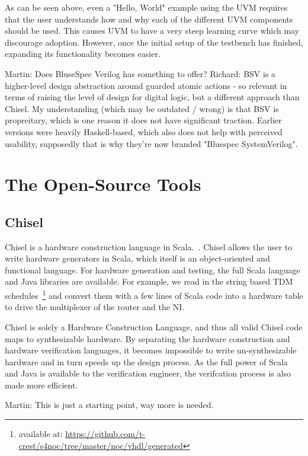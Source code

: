 \documentclass[a4paper, conference]{IEEEtran}
\newcommand{\martin}[1]{{\color{blue} Martin: #1}}
\newcommand{\ducky}[1]{{\color{orange} Richard: #1}}
\begin{document}
As can be seen above, even a "Hello, World" example using the UVM requires that the user understands how and why each of the different UVM components should be used. This causes UVM to have a very steep learning curve which may discourage adoption. However, once the initial setup of the testbench has finished, expanding its functionality becomes easier.


\martin{Does BluseSpec Verilog has something to offer?}
\ducky{BSV is a higher-level design abstraction around guarded atomic actions - so relevant in terms of raising the level of design for digital logic, but a different approach than Chisel. My understanding (which may be outdated / wrong) is that BSV is propreitary, which is one reason it does not have significant traction. Earlier versions were heavily Haskell-based, which also does not help with perceived usability, supposedly that is why they're now branded "Bluespec SystemVerilog".}

\section{The Open-Source Tools}

\subsection{Chisel}

Chisel is a hardware construction language in Scala.~\cite{chisel:dac2012}.
Chisel allows the user to write hardware generators in Scala, which itself is an object-oriented and functional language. For hardware generation and testing, the full Scala language and Java
libraries are available. For example, we read in the string based TDM
schedules~\footnote{available at: \url{https://github.com/t-crest/s4noc/tree/master/noc/vhdl/generated}}
and convert them with a few lines of Scala code into a hardware table to
drive the multiplexer of the router and the NI.

Chisel is solely a Hardware Construction Language, and thus all valid Chisel code maps to synthesizable hardware. By separating the hardware construction and hardware verification languages, it becomes impossible to write un-synthesizable hardware and in turn speeds up the design process. As the full power of Scala and Java is available to the verification engineer, the verifcation process is also made more efficient.

\martin{This is just a starting point, way more is needed.}
\end{document}

